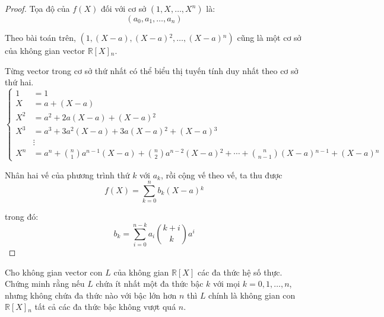 \documentclass[class=linearalgebra,crop=false]{standalone}
\begin{document}
\begin{proof}Tọa độ của $f(X)$ đối với cơ sở $(1, X, \ldots, X^{n})$ là:
    \[ (a_{0}, a_{1}, \ldots, a_{n}) \]
    \par Theo bài toán trên, $(1, (X - a), (X - a){}^{2}, \ldots, (X - a){}^{n})$ cũng là một cơ sở của không gian vector $\mathbb{R}[X]{}_{n}$.
    \par Từng vector trong cơ sở thứ nhất có thể biểu thị tuyến tính duy nhất theo cơ sở thứ hai.
    \[
        \begin{cases}
            1     & = 1                                                                                                                      \\
            X     & = a + (X-a)                                                                                                              \\
            X^{2} & = a^{2} + 2a(X-a) + (X-a){}^{2}                                                                                          \\
            X^{3} & = a^{3} + 3a^{2}(X-a) + 3a(X-a){}^{2} + (X-a){}^{3}                                                                      \\
                  & \vdots                                                                                                                   \\
            X^{n} & = a^{n} + \binom{n}{1}a^{n-1}(X-a) + \binom{n}{2}a^{n-2}(X-a){}^{2} + \cdots + \binom{n}{n-1}(X-a){}^{n-1} + (X-a){}^{n}
        \end{cases}
    \]
    \par Nhân hai vế của phương trình thứ $k$ với $a_{k}$, rồi cộng vế theo vế, ta thu được
    \[
        f(X) = \sum^{n}_{k=0}b_{k}(X-a){}^{k}
    \]
    \par trong đó:
    \[
        b_{k} = \sum^{n-k}_{i=0}a_{i}\binom{k+i}{k}a^{i}
    \]
\end{proof}

\begin{exercise}Cho không gian vector con $L$ của không gian $\mathbb{R}[X]$ các đa thức hệ số thực. Chứng minh rằng nếu $L$ chứa ít nhất một đa thức bậc $k$ với mọi $k = 0, 1,\ldots, n$, nhưng không chứa đa thức nào với bậc lớn hơn $n$ thì $L$ chính là không gian con $\mathbb{R}[X]{}_{n}$ tất cả các đa thức bậc không vượt quá $n$.
\end{exercise}
\end{document}
